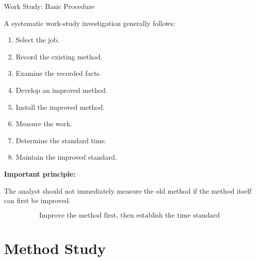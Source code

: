 \documentclass[aspectratio=169,10pt]{beamer}
\begin{document}
\begin{frame}[shrink=18]{Work Study: Basic Procedure}
\small

A systematic work-study investigation generally follows:

\begin{enumerate}
    \item Select the job.
    \item Record the existing method.
    \item Examine the recorded facts.
    \item Develop an improved method.
    \item Install the improved method.
    \item Measure the work.
    \item Determine the standard time.
    \item Maintain the improved standard.
\end{enumerate}

\vspace{5pt}

\textbf{Important principle:}

The analyst should not immediately measure the old method if the method
itself can first be improved.

\[
\boxed{
\text{Improve the method first, then establish the time standard}
}
\]

\end{frame}


\section{Method Study}
\end{document}
